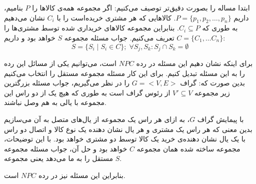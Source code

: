 \documentclass[]{article}
\begin{document}
ابتدا مساله را بصورت دقیق‌تر توصیف می‌کنیم:
اگر مجموعه همه‌ی کالاها را $P$ بنامیم، داریم $P = \lbrace p_1, p_2, \dots, p_n \rbrace$.
کالاهایی که هر مشتری خریده‌است را با $C_i$ نشان می‌دهیم به طوری که $C_i \subseteq P$.
بنابراین مجموعه کالاهای خریداری شده توسط مشتری‌ها را $C = \lbrace C_1, \dots C_n \rbrace$
تعریف می‌کنیم. جواب مسئله مجموعه $S$ خواهد بود و داریم:
$$ S = \lbrace S_i \; | \; S_i \in C \rbrace ; \; \forall S_j, S_k: S_j \cap S_k = \emptyset $$

برای اینکه نشان دهیم این مسئله در رده $NPC$ است،
می‌توانیم یکی از مسائل این رده را به این مسئله تبدیل کنیم.
برای این کار مسئله مجموعه مستقل را انتخاب می‌کنیم بدین صورت که:
گراف $G = <V, E>$ را در نظر می‌گیریم، جواب مسئله بزرگترین زیر مجموعه
$V' \subseteq V$
از رئوس گراف است به طوری که هیچ یک از دو راس این مجموعه با یالی به هم وصل نباشند.

با پیمایش گراف $G$، به ازای هر راس یک مجموعه از یال‌های متصل به آن می‌سازیم
بدین معنی که هر راس یک مشتری و هر یال نشان دهنده یک نوع کالا و اتصال دو راس با یک یال
نشان دهنده‌ی خرید یک کالا توسط دو مشتری خواهد بود.
با این توضیحات، مجموعه ساخته شده همان مجموعه $C$ خواهد بود و
حل آن، جواب مسئله مجموعه مستقل را به ما می‌دهد
یعنی مجموعه $S$.

بنابراین این مسئله نیز در رده $NPC$ است.
\end{document}
